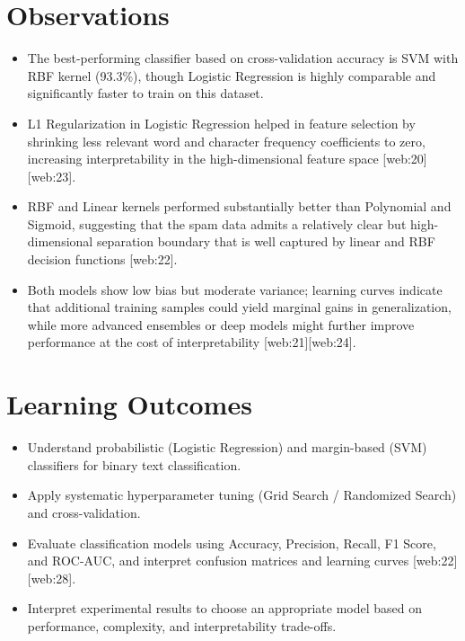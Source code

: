 \documentclass[11pt]{article}
\begin{document}
\section*{Observations}
\begin{itemize}
\item The best-performing classifier based on cross-validation accuracy is SVM with RBF kernel (93.3\%), though Logistic Regression is highly comparable and significantly faster to train on this dataset.
\item L1 Regularization in Logistic Regression helped in feature selection by shrinking less relevant word and character frequency coefficients to zero, increasing interpretability in the high-dimensional feature space [web:20][web:23].
\item RBF and Linear kernels performed substantially better than Polynomial and Sigmoid, suggesting that the spam data admits a relatively clear but high-dimensional separation boundary that is well captured by linear and RBF decision functions [web:22].
\item Both models show low bias but moderate variance; learning curves indicate that additional training samples could yield marginal gains in generalization, while more advanced ensembles or deep models might further improve performance at the cost of interpretability [web:21][web:24].
\end{itemize}

\section*{Learning Outcomes}
\begin{itemize}
\item Understand probabilistic (Logistic Regression) and margin-based (SVM) classifiers for binary text classification.
\item Apply systematic hyperparameter tuning (Grid Search / Randomized Search) and cross-validation.
\item Evaluate classification models using Accuracy, Precision, Recall, F1 Score, and ROC-AUC, and interpret confusion matrices and learning curves [web:22][web:28].
\item Interpret experimental results to choose an appropriate model based on performance, complexity, and interpretability trade-offs.
\end{itemize}

\end{document}

